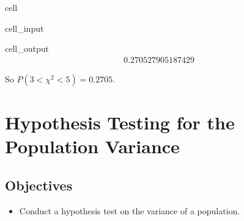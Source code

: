 \documentclass[letterpaper,10pt,english]{jupyterBook}
\begin{document}
\begin{sphinxuseclass}{cell}\begin{sphinxVerbatimInput}

\begin{sphinxuseclass}{cell_input}
\begin{sphinxVerbatim}[commandchars=\\\{\}]
\end{sphinxVerbatim}

\end{sphinxuseclass}\end{sphinxVerbatimInput}
\begin{sphinxVerbatimOutput}

\begin{sphinxuseclass}{cell_output}\begin{equation*}
\begin{split}0.270527905187429\end{split}
\end{equation*}
\end{sphinxuseclass}\end{sphinxVerbatimOutput}

\end{sphinxuseclass}
\sphinxAtStartPar
So \(P(3 < \chi^2 < 5) = 0.2705\).

\sphinxstepscope


\section{Hypothesis Testing for the Population Variance}
\label{\detokenize{Ch7 The Chi-Square Distribution/7.2 Hypothesis Testing for the Population Variance:hypothesis-testing-for-the-population-variance}}\label{\detokenize{Ch7 The Chi-Square Distribution/7.2 Hypothesis Testing for the Population Variance::doc}}

\subsection{Objectives}
\label{\detokenize{Ch7 The Chi-Square Distribution/7.2 Hypothesis Testing for the Population Variance:objectives}}\begin{itemize}
\item {} 
\sphinxAtStartPar
Conduct a hypothesis test on the variance of a population.

\end{itemize}
\end{document}
